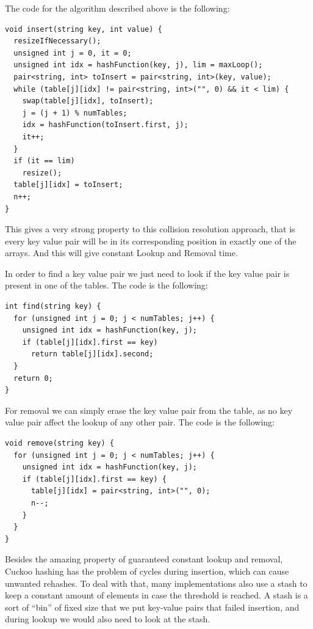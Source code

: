 
The code for the algorithm described above is the following:

\begin{lstlisting}
void insert(string key, int value) {
  resizeIfNecessary();
  unsigned int j = 0, it = 0;
  unsigned int idx = hashFunction(key, j), lim = maxLoop();
  pair<string, int> toInsert = pair<string, int>(key, value);
  while (table[j][idx] != pair<string, int>("", 0) && it < lim) {
    swap(table[j][idx], toInsert);
    j = (j + 1) % numTables;
    idx = hashFunction(toInsert.first, j);
    it++;
  }
  if (it == lim)
    resize();
  table[j][idx] = toInsert;
  n++;
}
\end{lstlisting}

This gives a very strong property to this collision resolution approach, that is every key value pair will be in its corresponding position in exactly one of the arrays. And this will give constant Lookup and Removal time. 

In order to find a key value pair we just need to look if the key value pair is present in one of the tables. The code is the following:

\newpage

\begin{lstlisting}
int find(string key) {
  for (unsigned int j = 0; j < numTables; j++) {
    unsigned int idx = hashFunction(key, j);
    if (table[j][idx].first == key)
      return table[j][idx].second;
  }
  return 0;
}
\end{lstlisting}

For removal we can simply erase the key value pair from the table, as no key value pair affect the lookup of any other pair. The code is the following:

\begin{lstlisting}
void remove(string key) {
  for (unsigned int j = 0; j < numTables; j++) {
    unsigned int idx = hashFunction(key, j);
    if (table[j][idx].first == key) {
      table[j][idx] = pair<string, int>("", 0);
      n--;
    }
  }
}
\end{lstlisting}

Besides the amazing property of guaranteed constant lookup and removal, Cuckoo hashing has the problem of cycles during insertion, which can cause unwanted rehashes. To deal with that, many implementations also use a stash to keep a constant amount of elements in case the threshold is reached. A stash is a sort of ``bin'' of fixed size that we put key-value pairs that failed insertion, and during lookup we would also need to look at the stash.

